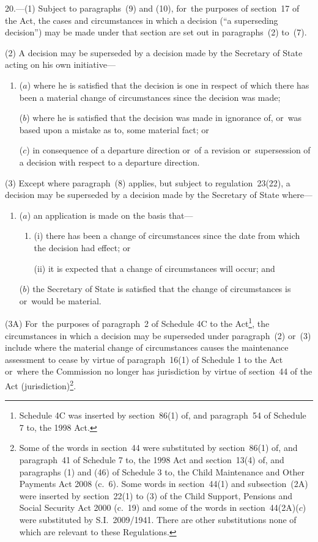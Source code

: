 \documentclass[a4paper,12pt]{article}
\begin{document}
20.—(1) Subject to paragraphs~(9) and (10), for~the purposes of section~17 of the Act, the cases and circumstances in which a decision (“a superseding decision”) may be made under that section are set out in paragraphs~(2) to~(7).

(2) A decision may be superseded by a decision made by the Secretary of State acting on his own initiative---
\begin{enumerate}\item[]
($a$) where he is satisfied that the decision is one in respect of which there has been a material change of circumstances since the decision was made;

($b$) where he is satisfied that the decision was made in ignorance of, or~was based upon a mistake as to, some material fact; or

($c$) in consequence of a departure direction or~of a revision or~supersession of a decision with respect to a departure direction.
\end{enumerate}

(3) Except where paragraph~(8) applies, 
but subject to regulation~23(22),  %
a decision may be superseded by a decision made by the Secretary of State where---
\begin{enumerate}\item[]
($a$) an application is made on the basis that---
\begin{enumerate}\item[]
(i) there has been a change of circumstances 
since the date from which the decision had effect;  %
or

(ii) it is expected that a change of circumstances will occur; and
\end{enumerate}

($b$) the Secretary of State is satisfied that the change of circumstances is or~would be material.
\end{enumerate}

(3A) For~the purposes of paragraph~2 of Schedule 4C to the Act\footnote{Schedule 4C was inserted by section~86(1) of, and paragraph~54 of Schedule 7 to, the 1998 Act.}, the circumstances in which a decision may be superseded under paragraph~(2) or~(3) include where the material change of circumstances causes the maintenance assessment to cease by virtue of paragraph~16(1) of Schedule 1 to the Act or~where the Commission no longer has jurisdiction by virtue of section~44 of the Act (jurisdiction)\footnote{Some of the words in section~44 were substituted by section~86(1) of, and paragraph~41 of Schedule 7 to, the 1998 Act and section~13(4) of, and paragraphs (1) and (46) of Schedule 3 to, the Child Maintenance and Other Payments Act 2008 (c.~6). Some words in section~44(1) and subsection~(2A) were inserted by section~22(1) to (3) of the Child Support, Pensions and Social Security Act 2000 (c.~19) and some of the words in section~44(2A)($c$)  were substituted by S.I.~2009/1941. There are other substitutions none of which are relevant to these Regulations.}.
\end{document}
